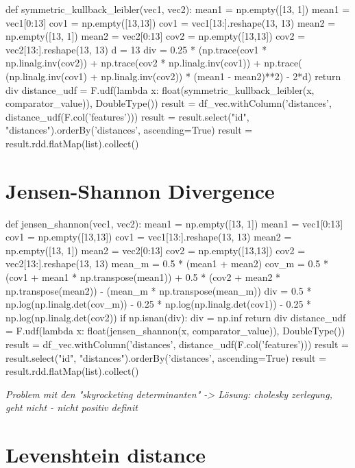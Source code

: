 \begin{pythonCode}
def symmetric_kullback_leibler(vec1, vec2):
    mean1 = np.empty([13, 1])
    mean1 = vec1[0:13]
    cov1 = np.empty([13,13])
    cov1 = vec1[13:].reshape(13, 13)
    mean2 = np.empty([13, 1])
    mean2 = vec2[0:13]
    cov2 = np.empty([13,13])
    cov2 = vec2[13:].reshape(13, 13)
    d = 13
    div = 0.25 * (np.trace(cov1 * np.linalg.inv(cov2)) + np.trace(cov2 * np.linalg.inv(cov1)) + np.trace( (np.linalg.inv(cov1) + np.linalg.inv(cov2)) * (mean1 - mean2)**2) - 2*d)
    return div
distance_udf = F.udf(lambda x: float(symmetric_kullback_leibler(x, comparator_value)), DoubleType())
result = df_vec.withColumn('distances', distance_udf(F.col('features')))
result = result.select("id", "distances").orderBy('distances', ascending=True)
result = result.rdd.flatMap(list).collect()
\end{pythonCode}


\section{Jensen-Shannon Divergence}

\begin{pythonCode}
def jensen_shannon(vec1, vec2):
    mean1 = np.empty([13, 1])
    mean1 = vec1[0:13]
    cov1 = np.empty([13,13])
    cov1 = vec1[13:].reshape(13, 13)
    mean2 = np.empty([13, 1])
    mean2 = vec2[0:13]
    cov2 = np.empty([13,13])
    cov2 = vec2[13:].reshape(13, 13)
    mean_m = 0.5 * (mean1 + mean2)
    cov_m = 0.5 * (cov1 + mean1 * np.transpose(mean1)) + 0.5 * (cov2 + mean2 * np.transpose(mean2)) - (mean_m * np.transpose(mean_m))
    div = 0.5 * np.log(np.linalg.det(cov_m)) - 0.25 * np.log(np.linalg.det(cov1)) - 0.25 * np.log(np.linalg.det(cov2))  
    if np.isnan(div):
        div = np.inf
    return div
distance_udf = F.udf(lambda x: float(jensen_shannon(x, comparator_value)), DoubleType())
result = df_vec.withColumn('distances', distance_udf(F.col('features')))
result = result.select("id", "distances").orderBy('distances', ascending=True)
result = result.rdd.flatMap(list).collect()

\end{pythonCode}

\textit{Problem mit den "skyrocketing determinanten" -> Lösung: cholesky zerlegung, geht nicht - nicht positiv definit}\cite[p.45]{schnitzer1}

\section{Levenshtein distance}

